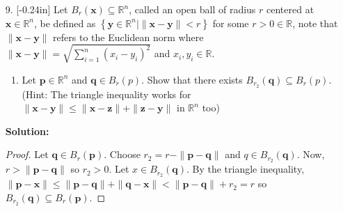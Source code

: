 \documentclass[letterpaper,12pt]{article}
\newcommand{\set}[1]{\left\{ #1 \right\}}
\theoremstyle{definition}
\begin{document}
\begin{enumerate}
    \item[9.] \reversemarginpar{}[-0.24in] 
 Let $B_r(\mathbf{x}) \subseteq \mathbb{R}^n$, called an open ball of radius $r$ centered at $\mathbf{x} \in \mathbb{R}^n$, be defined as $\set{\mathbf{y} \in \mathbb{R}^n | \| \mathbf{x}-\mathbf{y} \| < r}$ for some $r > 0 \in \mathbb{R}$, note that $\| \mathbf{x}-\mathbf{y} \|$ refers to the Euclidean norm where $\| \mathbf{x}-\mathbf{y} \| = \sqrt{\sum_{i=1}^n (x_i - y_i)^2}$ and $x_i,y_i \in \mathbb{R}$. \begin{enumerate}
        \item Let $\mathbf{p} \in \mathbb{R}^n$ and $\mathbf{q} \in B_r(p)$. Show that there exists $B_{r_2}(\mathbf{q}) \subseteq B_r(p)$. (Hint: The triangle inequality works for $\|\mathbf{x} - \mathbf{y}\| \leq \|\mathbf{x} - \mathbf{z}\| + \|\mathbf{z} -\mathbf{y} \|$ in $\mathbb{R}^n$ too)
    \end{enumerate}
      \begin{mdframed}
            \textbf{Solution:}
            \begin{proof}
                Let $\mathbf{q} \in B_r(\mathbf{p})$. Choose $r_2 = r - \| \mathbf{p}-\mathbf{q}\|$ and $q \in B_{r_2}(\mathbf{q})$. Now, $r > \|  \mathbf{p}-\mathbf{q}\|$ so $r_2 > 0$. Let $x \in B_{r_2}(\mathbf{q})$. By the triangle inequality, $\|\mathbf{p}-\mathbf{x} \| \leq \| \mathbf{p}-\mathbf{q}\| + \|\mathbf{q}-\mathbf{x}\| < \|\mathbf{p}-\mathbf{q}\| + r_2 = r$ so $B_{r_2}(\mathbf{q}) \subseteq B_r(\mathbf{p})$. 
            \end{proof}
        \end{mdframed}
\end{enumerate}
\pagebreak
\end{document}
